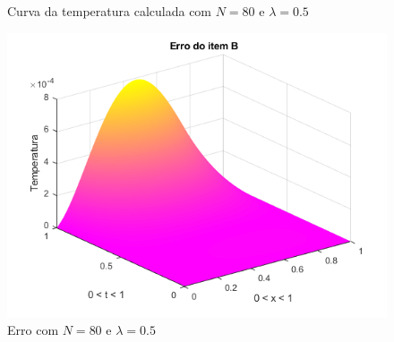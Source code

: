 \documentclass[12pt]{article}
\begin{document}
\begin{spacing}{1.5}
\begin{figure}
    \caption{Curva da temperatura calculada com $N=80$ e $\lambda=0.5$}
    \label{fig:B_n80lambda0-5_calc}
\end{figure}
\begin{figure}
    \centering
    \includegraphics[width=0.8\linewidth]{Primeira_Tarefa/ItemB/n80_lambda0-5_erro.png}
    \caption{Erro com $N=80$ e $\lambda=0.5$}
    \label{fig:B_n80lambda0-5_erro}
\end{figure}



\end{spacing}
\end{document}
